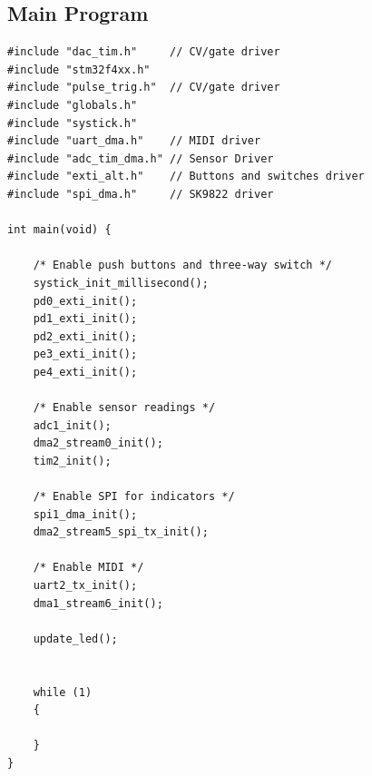 \documentclass[12pt]{article}
\numberwithin{subsubsubsection}{subsubsection}
\begin{document}
\subsection{Main Program}
\begin{verbatim}
#include "dac_tim.h"     // CV/gate driver
#include "stm32f4xx.h"
#include "pulse_trig.h"  // CV/gate driver
#include "globals.h"
#include "systick.h"
#include "uart_dma.h"    // MIDI driver
#include "adc_tim_dma.h" // Sensor Driver
#include "exti_alt.h"    // Buttons and switches driver
#include "spi_dma.h"     // SK9822 driver

int main(void) {

    /* Enable push buttons and three-way switch */
    systick_init_millisecond();
    pd0_exti_init();
    pd1_exti_init();
    pd2_exti_init();
    pe3_exti_init();
    pe4_exti_init();
    
    /* Enable sensor readings */
    adc1_init();
    dma2_stream0_init();
    tim2_init();
    
    /* Enable SPI for indicators */
    spi1_dma_init();
    dma2_stream5_spi_tx_init();
    
    /* Enable MIDI */
    uart2_tx_init();
    dma1_stream6_init();
    
    update_led();

    
    while (1)
    {

    }
}
\end{verbatim}
\end{document}
